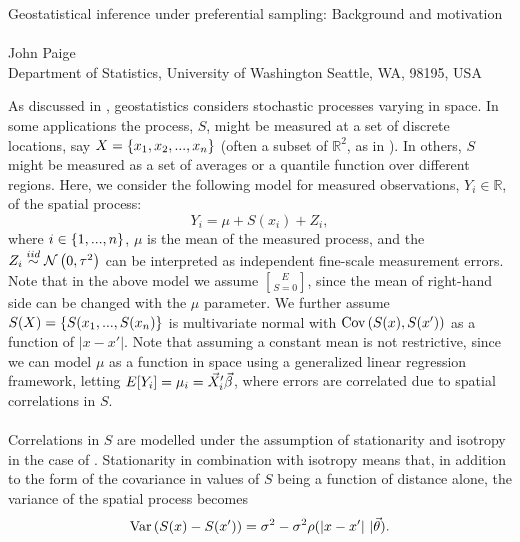 \documentclass{uwstat572}
\begin{document}

\begin{center}
  {\LARGE Geostatistical inference under preferential sampling: Background and motivation}\\\ \\
  {John Paige \\ 
    Department of Statistics, University of Washington Seattle, WA, 98195, USA
  }
\end{center}

As discussed in \citet{diggle2010}, geostatistics considers stochastic processes varying in space.  In some applications the process, $S$, might be measured at a set of discrete locations, say $X = \left\{x_1, x_2, ..., x_n\right\}$ (often a subset of $\mathbb{R}^2$, as in \citet{diggle2010}).  In others, $S$ might be measured as a set of averages or a quantile function over different regions.  Here, we consider the following model for measured observations, $Y_i \in \mathbb{R}$, of the spatial process:
\begin{equation}
Y_i = \mu + S(x_i) + Z_i,
\label{model}
\end{equation}
where $i \in \left\{1, ..., n\right\}$, $\mu$ is the mean of the measured process, and the $Z_i \stackrel{iid}{\sim} \mathcal{N} \left( 0, \tau^2 \right)$ can be interpreted as independent fine-scale measurement errors.  Note that in the above model we assume $E\brack{S} = 0$, since the mean of right-hand side can be changed with the $\mu$ parameter.  We further assume $S(X) = \left\{S(x_1, ..., S(x_n)\right\}$ is multivariate normal with $\text{Cov}\left(S(x), S(x')\right)$ as a function of $|x - x'|$.  Note that assuming a constant mean is not restrictive, since we can model $\mu$ as a function in space using a generalized linear regression framework, letting $E[Y_i] = \mu_i = \vec{X}_i' \vec{\beta}$, where errors are correlated due to spatial correlations in $S$.
\\\\
Correlations in $S$ are modelled under the assumption of stationarity and isotropy in the case of \citet{diggle2010}.  Stationarity in combination with isotropy means that, in addition to the form of the covariance in values of $S$ being a function of distance alone, the variance of the spatial process becomes
\begin{equation}
\text{Var}\left(S(x) - S(x')\right) = \sigma^2 - \sigma^2 \rho(|x - x'| \ \vert \vec{\theta}).
\label{variogram}
\end{equation}
\end{document}
